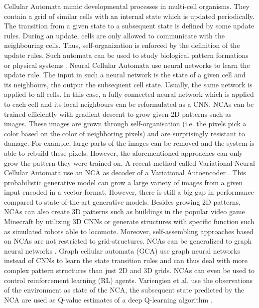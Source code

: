 
Cellular Automata mimic developmental processes in multi-cell organisms.
They contain a grid of similar cells with an internal state which is updated periodically.
The transition from a given state to a subsequent state is defined by some update rules.
During an update, cells are only allowed to communicate with the neighbouring cells.
Thus, self-organization is enforced by the definition of the update rules.
Such automata can be used to study biological pattern formations  or physical systems .
Neural Cellular Automata  use neural networks to learn the update rule.
The input in such a neural network is the state of a given cell and its neighbours, the output the subsequent cell state.
Usually, the same network is applied to all cells.
In this case, a fully connected neural network which is applied to each cell and its local neighbours can be reformulated as a CNN.
NCAs can be trained efficiently with gradient descent to grow given 2D patterns such as images.
These images are grown through self-organisation (i.e. the pixels pick a color based on the color of neighboring pixels) and are surprisingly resistant to damage.
For example, large parts of the images can be removed and the system is able to rebuild these pixels.
However, the aforementioned approaches can only grow the pattern they were trained on.
A recent method called Variational Neural Cellular Automata  use an NCA as decoder of a Variational Autoencoder .
This probabilistic generative model can grow a large variety of images from a given input encoded in a vector format.
However, there is still a big gap in performance compared to state-of-the-art generative models.
Besides growing 2D patterns, NCAs can also create 3D patterns such as buildings in the popular video game Minecraft by utilizing 3D CNNs  or generate structures with specific function such as simulated robots able to locomote.
Moreover, self-assembling approaches based on NCAs are not restricted to grid-structures.
NCAs can be generalized to graph neural networks .
Graph cellular automata (GCA) use graph neural networks  instead of CNNs to learn the state transition rules and can thus deal with more complex pattern structures than just 2D and 3D grids.
NCAs can even be used to control reinforcement learning (RL) agents.
Variengien et al.  use the observations of the environment as state of the NCA, the subsequent state predicted by the NCA are used as Q-value estimates of a deep Q-learning algorithm .

